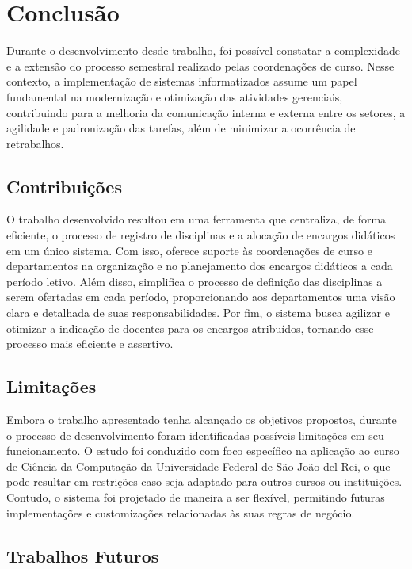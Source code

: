 \chapter{Conclusão}\label{cap:conclusao}

Durante o desenvolvimento desde trabalho, foi possível constatar a complexidade e a extensão do processo semestral realizado pelas coordenações de curso. Nesse contexto, a implementação de sistemas informatizados assume um papel fundamental na modernização e otimização das atividades gerenciais, contribuindo para a melhoria da comunicação interna e externa entre os setores, a agilidade e padronização das tarefas, além de minimizar a ocorrência de retrabalhos.

\section{Contribuições}

O trabalho desenvolvido resultou em uma ferramenta que centraliza, de forma eficiente, o processo de registro de disciplinas e a alocação de encargos didáticos em um único sistema. Com isso, oferece suporte às coordenações de curso e departamentos na organização e no planejamento dos encargos didáticos a cada período letivo. Além disso, simplifica o processo de definição das disciplinas a serem ofertadas em cada período, proporcionando aos departamentos uma visão clara e detalhada de suas responsabilidades. Por fim, o sistema busca agilizar e otimizar a indicação de docentes para os encargos atribuídos, tornando esse processo mais eficiente e assertivo.


\section{Limitações}\label{sec:limitacoes}

Embora o trabalho apresentado tenha alcançado os objetivos propostos, durante o processo de desenvolvimento foram identificadas possíveis limitações em seu funcionamento. O estudo foi conduzido com foco específico na aplicação ao curso de Ciência da Computação da Universidade Federal de São João del Rei, o que pode resultar em restrições caso seja adaptado para outros cursos ou instituições. Contudo, o sistema foi projetado de maneira a ser flexível, permitindo futuras implementações e customizações relacionadas às suas regras de negócio.


\section{Trabalhos Futuros}

